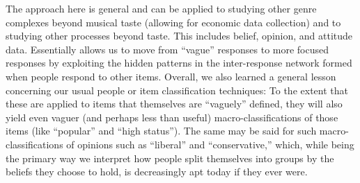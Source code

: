 \documentclass[a4paper,12pt]{extarticle}
\begin{document}
The approach here is general and can be applied to studying other genre complexes beyond musical taste (allowing for economic data collection) and to studying other processes beyond taste. This includes belief, opinion, and attitude data. Essentially allows us to move from ``vague'' responses to more focused responses by exploiting the hidden patterns in the inter-response network formed when people respond to other items. Overall, we also learned a general lesson concerning our usual people or item classification techniques: To the extent that these are applied to items that themselves are ``vaguely'' defined, they will also yield even vaguer (and perhaps less than useful) macro-classifications of those items (like ``popular'' and ``high status''). The same may be said for such macro-classifications of opinions such as ``liberal'' and ``conservative,'' which, while being the primary way we interpret how people split themselves into groups by the beliefs they choose to hold, is decreasingly apt today if they ever were. 
 


\end{document}
